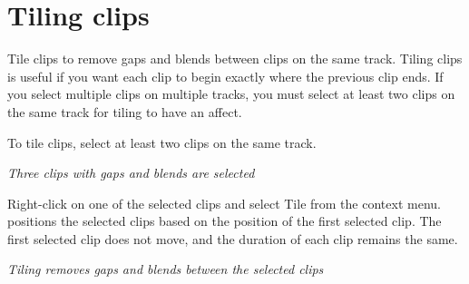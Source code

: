 \chapter{Tiling clips}
\hypertarget{md__library_2_package_cache_2com_8unity_8timeline_0d1_87_86_2_documentation_0i_2clp__tile}{}\label{md__library_2_package_cache_2com_8unity_8timeline_0d1_87_86_2_documentation_0i_2clp__tile}
\label{md__library_2_package_cache_2com_8unity_8timeline_0d1_87_86_2_documentation_0i_2clp__tile_autotoc_md1128}%
%
 Tile clips to remove gaps and blends between clips on the same track. Tiling clips is useful if you want each clip to begin exactly where the previous clip ends. If you select multiple clips on multiple tracks, you must select at least two clips on the same track for tiling to have an affect.

To tile clips, select at least two clips on the same track.



{\itshape Three clips with gaps and blends are selected}

Right-\/click on one of the selected clips and select Tile from the context menu.  positions the selected clips based on the position of the first selected clip. The first selected clip does not move, and the duration of each clip remains the same.



{\itshape Tiling removes gaps and blends between the selected clips} 